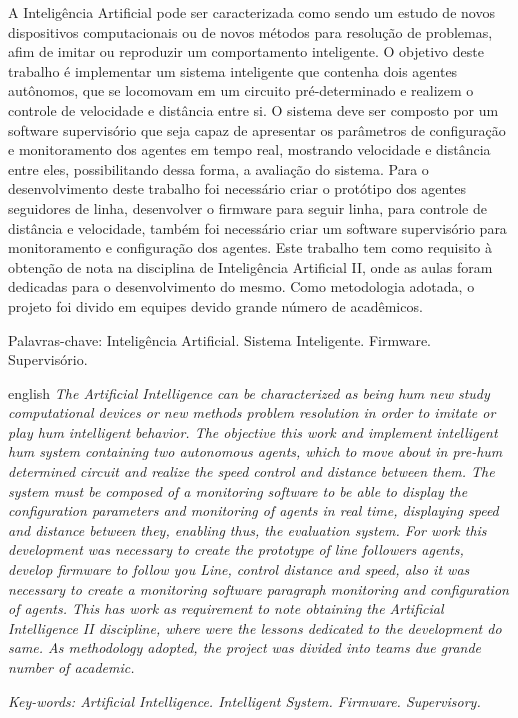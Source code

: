 
\begin{resumo}
\noindent
A Inteligência Artificial pode ser caracterizada como sendo um estudo de novos dispositivos computacionais ou de novos métodos para resolução de problemas, afim de imitar ou reproduzir um comportamento inteligente. O objetivo deste trabalho é implementar um sistema inteligente que contenha dois agentes autônomos, que se locomovam em um circuito pré-determinado e realizem o controle de velocidade e distância entre si. O sistema deve ser composto por um software supervisório que seja capaz de apresentar os parâmetros de configuração e monitoramento dos agentes em tempo real, mostrando velocidade e distância entre eles, possibilitando dessa forma, a avaliação do sistema. Para o desenvolvimento deste trabalho foi necessário criar o protótipo dos agentes seguidores de linha, desenvolver o firmware para seguir linha, para controle de distância e velocidade, também foi necessário criar um software supervisório para monitoramento e configuração dos agentes. 
Este trabalho tem como requisito à obtenção de nota na disciplina de Inteligência Artificial II, onde as aulas foram dedicadas para o desenvolvimento do mesmo. Como metodologia adotada, o projeto foi divido em equipes devido grande número de acadêmicos.


 \vspace{0.2cm}
    
 
 Palavras-chave: Inteligência Artificial. Sistema Inteligente. Firmware. Supervisório. 
\end{resumo}

\begin{resumo}[Abstract]	
 	\begin{otherlanguage*}{english}
 	\noindent 
	\textit{
	The Artificial Intelligence can be characterized as being hum new study computational devices or new methods problem resolution in order to imitate or play hum intelligent behavior.
	The objective this work and implement intelligent hum system containing two autonomous agents, which to move about in pre-hum determined circuit and realize the speed control and distance between them. The system must be composed of a monitoring software to be able to display the configuration parameters and monitoring of agents in real time, displaying speed and distance between they, enabling thus, the evaluation system.
	For work this development was necessary to create the prototype of line followers agents, develop firmware to follow you Line, control distance and speed, also it was necessary to create a monitoring software paragraph monitoring and configuration of agents.
	This has work as requirement to note obtaining the Artificial Intelligence II discipline, where were the lessons dedicated to the development do same. As methodology adopted, the project was divided into teams due grande number of academic.
	}
   \vspace{0.2cm}
 
\textit{
    Key-words: Artificial Intelligence. Intelligent System. Firmware. Supervisory.	
}
 	\end{otherlanguage*}
\end{resumo}